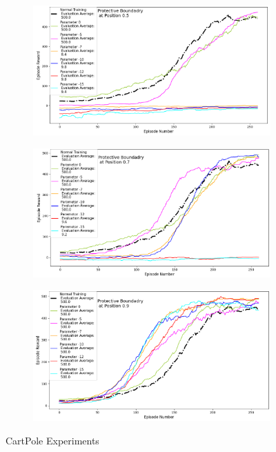\documentclass[journal]{IEEEtran}
\begin{document}
\begin{figure}
    \centering
    \captionsetup[subfigure]{font=scriptsize,labelfont=scriptsize}
    \begin{subfigure}[b]{0.5\textwidth}
      \centering
      \includegraphics[width=\textwidth]{Cartpole_with_Boundary_at_0.5.png}
    \end{subfigure}
    \vspace*{0.0mm}
    \begin{subfigure}[b]{0.5\textwidth}
      \centering
      \includegraphics[width=\textwidth]{Cartpole_with_Boundary_at_0.7.png}
    \end{subfigure}
    \vspace*{0.0mm}
    \begin{subfigure}[b]{0.5\textwidth}
      \centering
      \includegraphics[width=\textwidth]{Cartpole_with_Boundary_at_0.9.png}
    \end{subfigure}
    \caption{CartPole Experiments}
    \label{fig:CartPole}
\end{figure}
\end{document}
